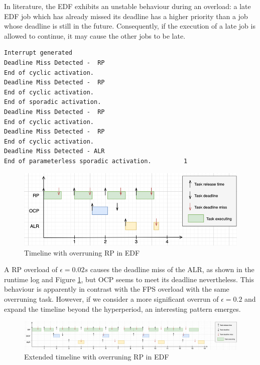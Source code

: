 \documentclass{article}
\begin{document}
In literature, the EDF exhibits an unstable behaviour during an overload: a late EDF job which has already missed its deadline has a higher priority than a job whose deadline is still in the future. Consequently, if the execution of a late job is allowed to continue, it may cause the other jobs to be late.

\begin{lstlisting}
Interrupt generated
Deadline Miss Detected -  RP
End of cyclic activation.
Deadline Miss Detected -  RP
End of cyclic activation.
End of sporadic activation.
Deadline Miss Detected -  RP
End of cyclic activation.
Deadline Miss Detected -  RP
End of cyclic activation.
Deadline Miss Detected - ALR
End of parameterless sporadic activation.         1
\end{lstlisting}

\begin{figure}[!htbp]
\centering
\includegraphics[width=6.5in]{images/timeline-overload-edf-rp}
\caption{Timeline with overruning RP in EDF}
\label{timeline-overload-edf-rp}
\end{figure}

A RP overload of $\epsilon = 0.02s$ causes the deadline miss of the ALR, as shown in the runtime log and Figure \ref{timeline-overload-edf-rp}, but OCP seems to meet its deadline nevertheless. This behaviour is apparently in contrast with the FPS overload with the same overruning task. However, if we consider a more significant overrun of $\epsilon = 0.2$ and expand the timeline beyond the hyperperiod, an interesting pattern emerges.

\begin{figure}[!htbp]
\centering
\includegraphics[width=6.5in]{images/timeline-overload-edf-extended}
\caption{Extended timeline with overruning RP in EDF}
\label{timeline-overload-edf-extended}
\end{figure}
\end{document}
